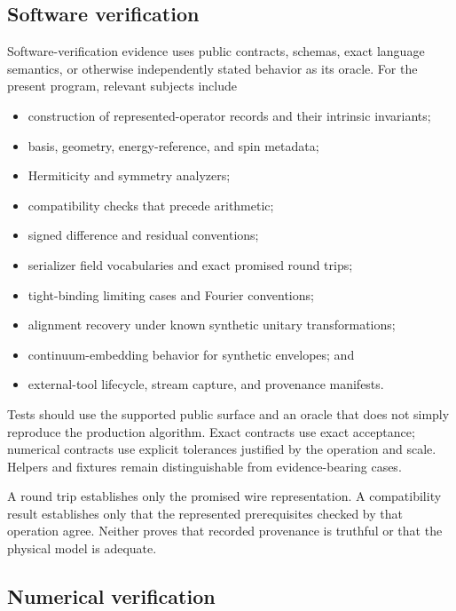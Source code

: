 \subsection{Software verification}


Software-verification evidence uses public contracts, schemas, exact language
semantics, or otherwise independently stated behavior as its oracle. For the
present program, relevant subjects include

\begin{itemize}
  \item construction of represented-operator records and their intrinsic
    invariants;
  \item basis, geometry, energy-reference, and spin metadata;
  \item Hermiticity and symmetry analyzers;
  \item compatibility checks that precede arithmetic;
  \item signed difference and residual conventions;
  \item serializer field vocabularies and exact promised round trips;
  \item tight-binding limiting cases and Fourier conventions;
  \item alignment recovery under known synthetic unitary transformations;
  \item continuum-embedding behavior for synthetic envelopes; and
  \item external-tool lifecycle, stream capture, and provenance manifests.
\end{itemize}

Tests should use the supported public surface and an oracle that does not simply
reproduce the production algorithm. Exact contracts use exact acceptance;
numerical contracts use explicit tolerances justified by the operation and
scale. Helpers and fixtures remain distinguishable from evidence-bearing cases.

A round trip establishes only the promised wire representation. A compatibility
result establishes only that the represented prerequisites checked by that
operation agree. Neither proves that recorded provenance is truthful or that the
physical model is adequate.

\subsection{Numerical verification}


